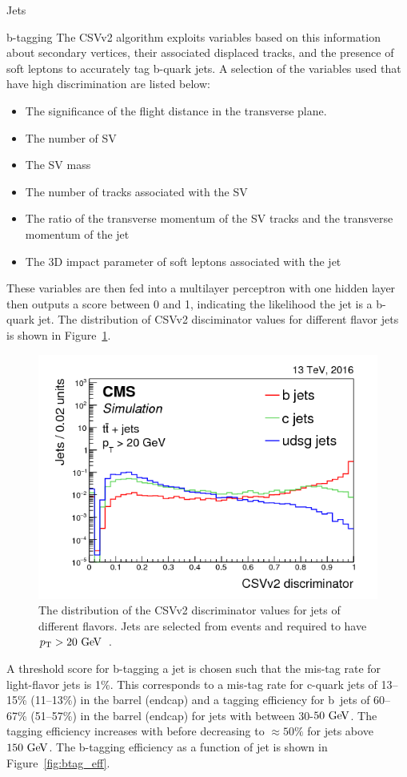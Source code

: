 \begin{section}{Jets}
\begin{subsection}{b-tagging}
The CSVv2 algorithm exploits variables based on this information about secondary vertices, their associated displaced tracks, and the presence of soft leptons to accurately tag b-quark jets.
A selection of the variables used that have high discrimination are listed below:

\begin{itemize}
\item The significance of the flight distance in the transverse plane.
\item The number of SV
\item The SV mass
\item The number of tracks associated with the SV
\item The ratio of the transverse momentum of the SV tracks and the transverse momentum of the jet
\item The 3D impact parameter of soft leptons associated with the jet
\end{itemize}

These variables are then fed into a multilayer perceptron with one hidden layer then outputs a score between 0 and 1, indicating the likelihood the jet is a b-quark jet.
The distribution of CSVv2 disciminator values for different flavor jets is shown in Figure~\ref{fig:csv_discriminator}.

\begin{figure}[tbp!]
\centering
\includegraphics[angle=0,width=0.80\columnwidth]{fig/csv_discriminator.png}
\caption{The distribution of the CSVv2 discriminator values for jets of different flavors.
Jets are selected from \ttbar events and required to have $p_{\mathrm{T}} > 20~\mathrm{Ge\kern -0.1em V}$~\cite{Sirunyan:2017ezt}.}
\label{fig:csv_discriminator}
\end{figure}

A threshold score for b-tagging a jet is chosen such that the mis-tag rate for light-flavor jets is 1\%.
This corresponds to a mis-tag rate for c-quark jets of 13--15\% (11--13\%) in the barrel (endcap) and a tagging efficiency for b~jets of 60--67\% (51--57\%) in the barrel (endcap) for jets with \pT between $30$-$50~\mathrm{Ge\kern -0.1em V}$.
The tagging efficiency increases with \pT before decreasing to $\approx 50\%$ for jets above $150~\mathrm{Ge\kern -0.1em V}$.
The b-tagging efficiency as a function of jet \pT is shown in Figure~\ref{fig:btag_eff}.


\end{subsection}
\end{section}
